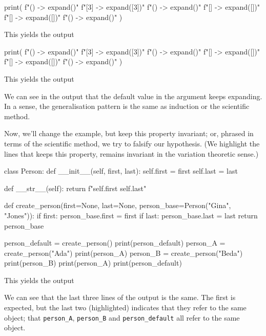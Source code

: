 \begin{description}
    \begin{minipage}[t]{0.45\columnwidth}
      \begin{pyblock}[default1]
print(
  f"()  -> {expand()}\n"
  f"[3] -> {expand([3])}\n"
  f"()  -> {expand()}\n"
  f"[]  -> {expand([])}\n"
  f"[]  -> {expand([])}\n"
  f"()  -> {expand()}\n"
)
      \end{pyblock}
      This yields the output
      \printpythontex[verbatim]
    \end{minipage}
    \hfill
    \begin{minipage}[t]{0.45\columnwidth}
      \begin{pyblock}[default2]
print(
  f"()  -> {expand()}\n"
  f"[3] -> {expand([3])}\n"
  f"()  -> {expand()}\n"
  f"[]  -> {expand([])}\n"
  f"[]  -> {expand([])}\n"
  f"()  -> {expand()}\n"
)
      \end{pyblock}
      This yields the output
      \printpythontex[verbatim][highlightlines={1,3,6}]
    \end{minipage}

    We can see in the output that the default value in the argument keeps 
    expanding.
    In a sense, the generalisation pattern is the same as induction or the 
    scientific method.

    Now, we'll change the example, but keep this property invariant;
    or, phrased in terms of the scientific method, we try to falsify our 
    hypothesis.
    (We highlight the lines that keeps this property, \ie remains invariant in 
    the variation theoretic sense.)
    \begin{pyblock}[default1][highlightlines={10-12}]
class Person:
  def __init__(self, first, last):
    self.first = first
    self.last = last

  def __str__(self):
    return f"{self.first} {self.last}"

def create_person(first=None, last=None,
                  person_base=Person("Gina", "Jones")):
  if first: person_base.first = first
  if last: person_base.last = last
  return person_base

person_default = create_person()
print(person_default)
person_A = create_person("Ada")
print(person_A)
person_B = create_person("Beda")
print(person_B)
print(person_A)
print(person_default)
    \end{pyblock}
    This yields the output
    \printpythontex[verbatim][highlightlines={4-5}]

    We can see that the last three lines of the output is the same.
    The first is expected, but the last two (highlighted) indicates that they 
    refer to the same object; \ie that \texttt{person_A}, 
    \texttt{person_B} and \texttt{person_default} all 
    refer to the same object.


\end{description}
